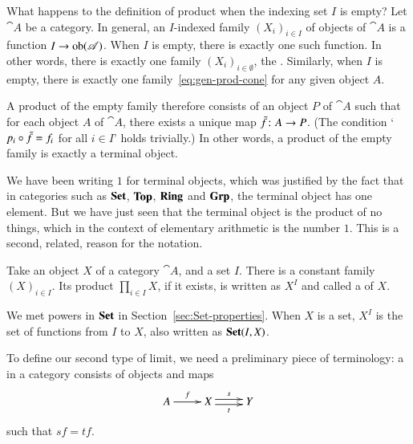 \begin{example}
\label{eg:arb-prods-terminal}
What happens to the definition of product when the indexing set $I$ is
empty?%
%
%
Let $\cat{A}$ be a category.  In general, an $I$-indexed family
$(X_i)_{i \in I}$ of objects of $\cat{A}$ is a function $I \to
\operatorname{ob}(\mathscr{A})$.  When $I$ is empty, there is exactly one such function.  In
other words, there is exactly one family $(X_i)_{i \in \emptyset}$, the
.  Similarly, when $I$ is empty, there is exactly one
family~\eqref{eq:gen-prod-cone} for any given object $A$.

A product of the empty family therefore consists of an object $P$ of $\cat{A}$
such that for each object $A$ of $\cat{A}$, there exists a unique map
$\bar{f}\from A \to P$.  (The condition `$p_i \mathbin{\circ} \bar{f} = f_i$ for all $i
\in I$' holds trivially.)  In other words, a product of the empty family is
exactly a terminal%
%
%
object.

We have been writing $1$%
%
%
for terminal objects, which was justified by the fact that in categories
such as $\mathbf{Set}$, $\mathbf{Top}$, $\mathbf{Ring}$ and $\mathbf{Grp}$, the terminal object has one%
%
%
element.  But we have just seen that the terminal object is the product of
no things, which in the context of elementary arithmetic%
%
%
is the number $1$.  This is a second, related, reason for the notation.
\end{example}

\begin{example}
Take an object $X$ of a category $\cat{A}$, and a set $I$.  There is a
constant family $(X)_{i \in I}$.  Its product $\prod_{i \in I} X$, if it
exists, is written as $X^I$%
%
%
and called a %
%
%
of $X$.

We met powers in $\mathbf{Set}$ in Section~\ref{sec:Set-properties}.  When $X$ is a
set, $X^I$ is the set of functions from $I$ to $X$, also written as
$\mathbf{Set}(I, X)$.
\end{example}




To define our second type of limit, we need a preliminary piece of
terminology: a %
%
%
in a category consists of objects and maps
%
\begin{equation}
\label{eq:fork}
\xymatrix{
A \ar[r]^f   &
X \ar@<.5ex>[r]^s \ar@<-.5ex>[r]_t    &
Y
}
\end{equation}
%
such that $sf = tf$.

